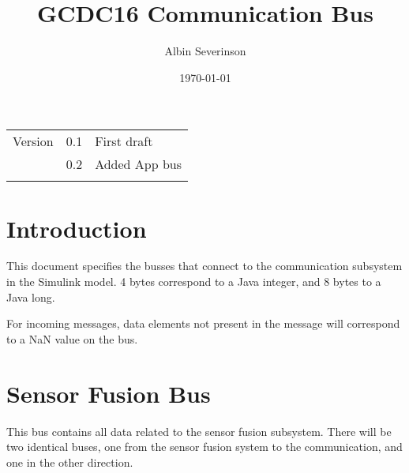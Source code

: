 \documentclass[11pt]{article}
\author{Albin Severinson}
\date{\today}
\title{GCDC16 Communication Bus}
\begin{document}
\maketitle
\tableofcontents

\begin{center}
\begin{tabular}{lrl}
Version & 0.1 & First draft\\
 & 0.2 & Added App bus\\
 &  & \\
\end{tabular}
\end{center}

\section{Introduction}
\label{sec:orgheadline1}
This document specifies the busses that connect to the communication
subsystem in the Simulink model. 4 bytes correspond to a Java integer,
and 8 bytes to a Java long.

For incoming messages, data elements not present in the message will
correspond to a NaN value on the bus.


\section{Sensor Fusion Bus}
\label{sec:orgheadline2}
This bus contains all data related to the sensor fusion subsystem.
There will be two identical buses, one from the sensor fusion system
to the communication, and one in the other direction. 
\end{document}
